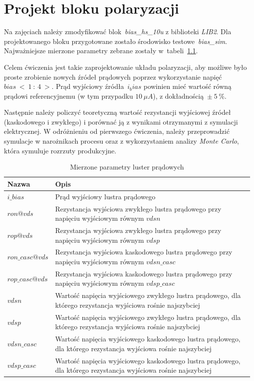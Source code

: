\documentclass[twoside,pl,final]{labman}
\begin{document}
\chapter{Projekt bloku polaryzacji}
\label{work}

Na zajęciach należy zmodyfikować blok~\emph{bias\_hs\_10u}
z biblioteki \emph{LIB2}.
Dla projektowanego bloku przygotowane zostało
środowisko testowe~\emph{bias\_sim}.
Najważniejsze mierzone parametry zebrane
zostały w~tabeli~\ref{tab:work:measure}.

Celem ćwiczenia jest takie zaprojektowanie układu polaryzacji,
aby możliwe było proste zrobienie nowych źródeł prądowych
poprzez wykorzystanie napięć~$bias~<~1~:~4~>$.
Prąd wyjściowy źródła~$i_bias$ powinien mieć wartość
równą prądowi referencyjnemu (w tym przypadku $10~\mu{}A$),
z dokładnością~$\pm~5~\%$.

Następnie należy policzyć teoretyczną wartość rezystancji wyjściowej
źródeł (kaskodowego i zwykłego) i porównać ją
z wynikami otrzymanymi z symulacji elektrycznej.
W odróżnieniu od pierwszego ćwiczenia,
należy przeprowadzić symulacje w narożnikach procesu
 oraz z wykorzystaniem analizy \emph{Monte Carlo},
która symuluje rozrzuty produkcyjne.

\begin{table}[htbp]
  \centering
  \caption{Mierzone parametry luster prądowych}
  \label{tab:work:measure}
  \begin{tabular}{l p{}}
    \hline \hline
    Nazwa & Opis \\
    \hline
    $i\_bias$ & Prąd wyjściowy lustra prądowego \\
    $ron@vds$ & Rezystancja wyjściowa zwykłego lustra prądowego przy napięciu wyjściowym równym $vdsn$ \\
    $rop@vds$ & Rezystancja wyjściowa zwykłego lustra prądowego przy napięciu wyjściowym równym $vdsp$ \\
    $ron\_casc@vds$ & Rezystancja wyjściowa kaskodowego lustra prądowego przy napięciu wyjściowym równym $vdsn\_casc$ \\
    $rop\_casc@vds$ & Rezystancja wyjściowa kaskodowego lustra prądowego przy napięciu wyjściowym równym $vdsp\_casc$ \\
    $vdsn$ & Wartość napięcia wyjściowego zwykłego lustra prądowego, dla którego rezystancja wyjściowa rośnie najszybciej \\
    $vdsp$ & Wartość napięcia wyjściowego zwykłego lustra prądowego, dla którego rezystancja wyjściowa rośnie najszybciej \\
    $vdsn\_casc$ & Wartość napięcia wyjściowego kaskodowego lustra prądowego, dla którego rezystancja wyjściowa rośnie najszybciej \\
    $vdsp\_casc$ & Wartość napięcia wyjściowego kaskodowego lustra prądowego, dla którego rezystancja wyjściowa rośnie najszybciej \\
    \hline \hline
  \end{tabular}
\end{table}
\end{document}
